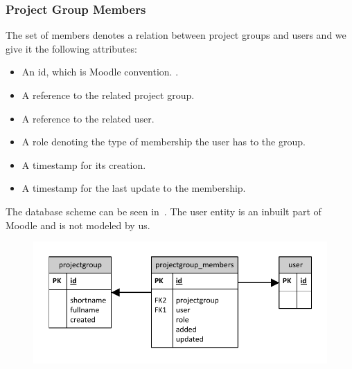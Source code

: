 \subsubsection{Project Group Members}
The set of members denotes a relation between project groups and users and we give it the following attributes: 
\begin{itemize}
	\item An id, which is Moodle convention. \cite{moodledb}.
	\item A reference to the related project group.
	\item A reference to the related user.
	\item A role denoting the type of membership the user has to the group.
	\item A timestamp for its creation.
	\item A timestamp for the last update to the membership. 
\end{itemize}
The database scheme can be seen in~. 
The user entity is an inbuilt part of Moodle and is not modeled by us. 
\begin{figure}
	\centering
		\includegraphics{images/projectgroupsdb.pdf}
	\label{fig:projectgroupsdb}
\end{figure}


